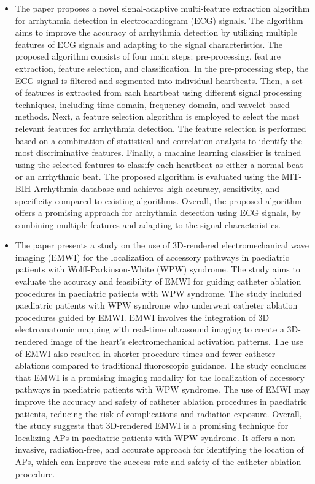 \begin{itemize}
	\item The paper proposes a novel signal-adaptive multi-feature extraction algorithm for arrhythmia detection in electrocardiogram (ECG) signals. The algorithm aims to improve the accuracy of arrhythmia detection by utilizing multiple features of ECG signals and adapting to the signal characteristics. The proposed algorithm consists of four main steps: pre-processing, feature extraction, feature selection, and classification. In the pre-processing step, the ECG signal is filtered and segmented into individual heartbeats. Then, a set of features is extracted from each heartbeat using different signal processing techniques, including time-domain, frequency-domain, and wavelet-based methods. Next, a feature selection algorithm is employed to select the most relevant features for arrhythmia detection. The feature selection is performed based on a combination of statistical and correlation analysis to identify the most discriminative features. Finally, a machine learning classifier is trained using the selected features to classify each heartbeat as either a normal beat or an arrhythmic beat. The proposed algorithm is evaluated using the MIT-BIH Arrhythmia database and achieves high accuracy, sensitivity, and specificity compared to existing algorithms. Overall, the proposed algorithm offers a promising approach for arrhythmia detection using ECG signals, by combining multiple features and adapting to the signal characteristics. 
	
	\item The paper presents a study on the use of 3D-rendered electromechanical wave imaging (EMWI) for the localization of accessory pathways in paediatric patients with Wolff-Parkinson-White (WPW) syndrome. The study aims to evaluate the accuracy and feasibility of EMWI for guiding catheter ablation procedures in paediatric patients with WPW syndrome. The study included paediatric patients with WPW syndrome who underwent catheter ablation procedures guided by EMWI. EMWI involves the integration of 3D electroanatomic mapping with real-time ultrasound imaging to create a 3D-rendered image of the heart's electromechanical activation patterns. The use of EMWI also resulted in shorter procedure times and fewer catheter ablations compared to traditional fluoroscopic guidance. The study concludes that EMWI is a promising imaging modality for the localization of accessory pathways in paediatric patients with WPW syndrome. The use of EMWI may improve the accuracy and safety of catheter ablation procedures in paediatric patients, reducing the risk of complications and radiation exposure. Overall, the study suggests that 3D-rendered EMWI is a promising technique for localizing APs in paediatric patients with WPW syndrome. It offers a non-invasive, radiation-free, and accurate approach for identifying the location of APs, which can improve the success rate and safety of the catheter ablation procedure. 
	

\end{itemize}
